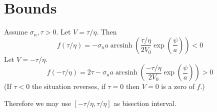 \documentclass[paper=a4]{scrartcl}
\DeclareMathOperator{\arcsinh}{arcsinh}
\begin{document}
\section{Bounds}

Assume $\sigma_n, \tau > 0$. Let $V=\tau/\eta$. Then
\begin{equation}
    f(\tau/\eta) = - \sigma_n a \arcsinh\left(
        \dfrac{\tau/\eta}{2V_0}\exp\left(\dfrac{\psi}{a}\right)
    \right) < 0
\end{equation}
Let $V=-\tau/\eta$.
\begin{equation}
    f(-\tau/\eta) = 2\tau - \sigma_n a \arcsinh\left(
        \dfrac{-\tau/\eta}{2V_0}\exp\left(\dfrac{\psi}{a}\right)
    \right) > 0
\end{equation}
(If $\tau < 0$ the situation reverses, if $\tau = 0$ then $V=0$ is a zero of $f$.)

Therefore we may use $[-\tau/\eta, \tau/\eta]$ as bisection interval.
\end{document}
